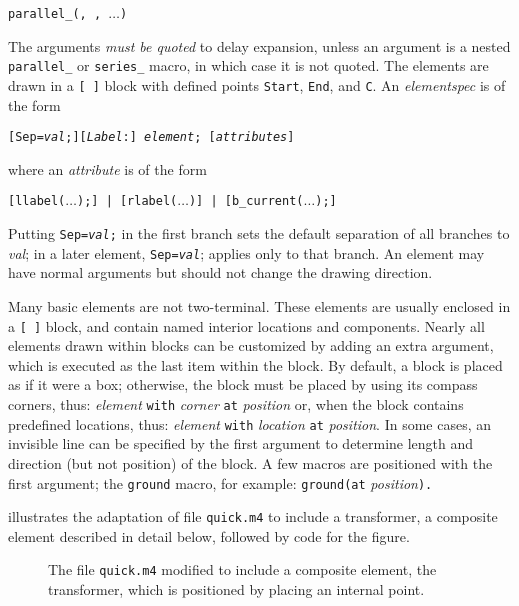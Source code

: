 {\tt parallel\_({\RQ, \RQ,}
 $\ldots$)}

The arguments {\em must be quoted} to delay expansion, unless an argument
is a nested {\tt parallel\_} or {\tt series\_} macro,
in which case it is not quoted.
The elements are drawn in a {\tt [ ]} block with defined points
{\tt Start}, {\tt End}, and {\tt C}.
An {\sl elementspec} is of the form

{\tt [Sep={\sl val};][{\sl Label}:] {\sl element}; [{\sl attributes}]}

\noindent
where an {\sl attribute} is of the form

{\tt [llabel($\ldots$);] | [rlabel($\ldots$)] | [b\_current($\ldots$);]}

Putting {\tt Sep={\sl val};} in the first branch sets the default
separation of all branches to {\sl val}; in a later
element, {\tt Sep={\sl val}}; applies only to that branch.  
An element may have normal arguments but should
not change the drawing direction. 

Many basic elements are not two-terminal. These elements are usually enclosed in
a \verb|[ ]| \pic block, and contain named interior locations and components.
Nearly all elements drawn within blocks can be customized by adding an
extra argument, which is executed as the last item within the block.
By default, a block is placed as if it were a box; otherwise,
the block must be placed by using its compass corners, thus:
  {\sl element} {\tt with} {\sl corner} {\tt at} {\sl position} 
or, when the block contains predefined locations, thus:
  {\sl element} {\tt with} {\sl location} {\tt at} {\sl position}.
In some cases, an invisible line can be specified by the first argument
to determine length and direction (but not position) of the block.
A few macros are positioned with the first argument;
the {\tt ground} macro, for example:
  {\tt ground(}{\tt at} {\sl position}{\tt ).} 

\enlargethispage{\baselineskip}
 illustrates the adaptation of file {\tt quick.m4} to
include a transformer, a composite element described in detail below,
followed by code for the figure.
\begin{figure}[H]
   
   \caption{The file {\tt quick.m4} modified to include a composite
     element, the transformer, which is positioned by placing an
     internal point.}
   \label{QTrans}
   \end{figure}

